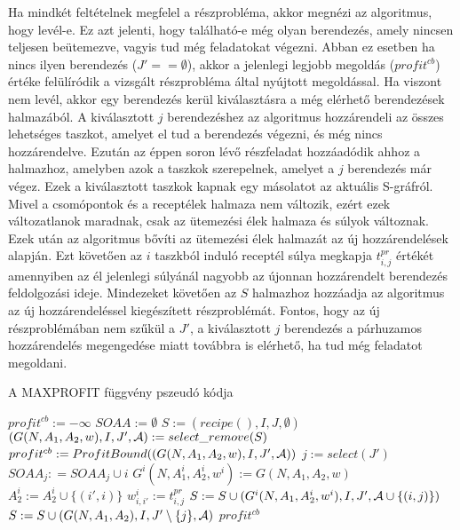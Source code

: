 Ha mindkét feltételnek megfelel a részprobléma, akkor megnézi az algoritmus, hogy levél-e. Ez azt jelenti, hogy található-e még olyan berendezés, amely nincsen teljesen beütemezve, vagyis tud még feladatokat végezni. Abban ez esetben ha nincs ilyen berendezés ($J'== \emptyset$), akkor a jelenlegi legjobb megoldás ($profit^{cb}$) értéke felülíródik a vizsgált részprobléma által nyújtott megoldással. Ha viszont nem levél, akkor egy berendezés kerül kiválasztásra a még elérhető berendezések halmazából. A kiválasztott $j$ berendezéshez az algoritmus hozzárendeli az összes lehetséges taszkot, amelyet el tud a berendezés végezni, és még nincs hozzárendelve. Ezután az éppen soron lévő részfeladat hozzáadódik ahhoz a halmazhoz, amelyben azok a taszkok szerepelnek, amelyet a $j$ berendezés már végez. Ezek a kiválasztott taszkok kapnak egy másolatot az aktuális S-gráfról. Mivel a csomópontok és a receptélek halmaza nem változik, ezért ezek változatlanok maradnak, csak az ütemezési élek halmaza és súlyok változnak. Ezek után az algoritmus bővíti az ütemezési élek halmazát az új hozzárendelések alapján. Ezt követően az $i$ taszkból induló receptél súlya megkapja $t^{pr}_{i,j}$ értékét amennyiben az él jelenlegi súlyánál nagyobb az újonnan hozzárendelt berendezés feldolgozási ideje. Mindezeket követően az $S$ halmazhoz hozzáadja az algoritmus az új hozzárendeléssel kiegészített részproblémát. Fontos, hogy az új részproblémában nem szűkül a $J'$, a kiválasztott $j$ berendezés a párhuzamos hozzárendelés megengedése miatt továbbra is elérhető, ha tud még feladatot megoldani. 

\begin{algorithm}[H]
\caption{A MAXPROFIT függvény pszeudó kódja}
\label{parhuzamos}
\begin{algorithmic}[1]
	\State $profit^{cb}:= -\infty$
	\State $SOAA:= \emptyset$
	\State $S:= {(recipe(),I,J,\emptyset)}$
		\State $(G(N,A_1,A_2,w),I,J',{\cal A}):= select\_remove(S)$		
					\State $profit^{cb}:=ProfitBound((G(N,A_1,A_2,w),I,J',{\cal A}))$
				\Else
					\State $j:=select(J')$
						\State $SOAA_j: = SOAA_j\cup i$
						\State $G^i(N,A_1^i,A_2^i,w^i):= G(N,A_1,A_2,w)$
							\State $A_2^i:= A_2^i \cup \{(i',i)\}$				
						\EndFor
								\State $w_{i,i'}^i:= t_{i,j}^{pr}$
							\EndIf
						\EndFor
						\State $S:= S \cup (G^i(N,A_1,A_2^i,w^i),I,J',{\cal A} \cup \{(i,j)\})$
					\EndFor
						\State $S:= S \cup (G(N,A_1,A_2),I,J'\setminus\{j\},{\cal A})$
					\EndIf					
				\EndIf
			\EndIf
		\EndIf
	\EndWhile
	\State \Return $profit^{cb}$
\EndProcedure
\end{algorithmic}
\end{algorithm}

